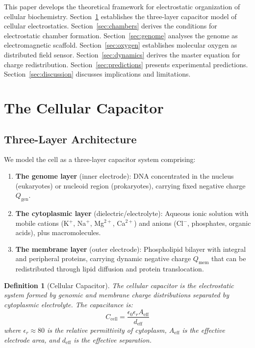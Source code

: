\documentclass[twocolumn,10pt,aps,prd,superscriptaddress,floatfix,nofootinbib]{revtex4-2}
\newtheorem{definition}[theorem]{Definition}
\theoremstyle{remark}
\newcommand{\Qgen}{Q_{\mathrm{gen}}}
\newcommand{\Qmem}{Q_{\mathrm{mem}}}
\begin{document}
This paper develops the theoretical framework for electrostatic organization of cellular biochemistry. Section~\ref{sec:capacitor} establishes the three-layer capacitor model of cellular electrostatics. Section~\ref{sec:chambers} derives the conditions for electrostatic chamber formation. Section~\ref{sec:genome} analyses the genome as electromagnetic scaffold. Section~\ref{sec:oxygen} establishes molecular oxygen as distributed field sensor. Section~\ref{sec:dynamics} derives the master equation for charge redistribution. Section~\ref{sec:predictions} presents experimental predictions. Section~\ref{sec:discussion} discusses implications and limitations.

\section{The Cellular Capacitor}
\label{sec:capacitor}

\subsection{Three-Layer Architecture}

We model the cell as a three-layer capacitor system comprising:

\begin{enumerate}
\item \textbf{The genome layer} (inner electrode): DNA concentrated in the nucleus (eukaryotes) or nucleoid region (prokaryotes), carrying fixed negative charge $\Qgen$.

\item \textbf{The cytoplasmic layer} (dielectric/electrolyte): Aqueous ionic solution with mobile cations (K$^+$, Na$^+$, Mg$^{2+}$, Ca$^{2+}$) and anions (Cl$^-$, phosphates, organic acids), plus macromolecules.

\item \textbf{The membrane layer} (outer electrode): Phospholipid bilayer with integral and peripheral proteins, carrying dynamic negative charge $\Qmem$ that can be redistributed through lipid diffusion and protein translocation.
\end{enumerate}

\begin{definition}[Cellular Capacitor]
\label{def:cell_capacitor}
The cellular capacitor is the electrostatic system formed by genomic and membrane charge distributions separated by cytoplasmic electrolyte. The capacitance is:
\begin{equation}
C_{\mathrm{cell}} = \frac{\epsilon_0 \epsilon_r A_{\mathrm{eff}}}{d_{\mathrm{eff}}}
\label{eq:cell_capacitance}
\end{equation}
where $\epsilon_r \approx 80$ is the relative permittivity of cytoplasm, $A_{\mathrm{eff}}$ is the effective electrode area, and $d_{\mathrm{eff}}$ is the effective separation.
\end{definition}
\end{document}
